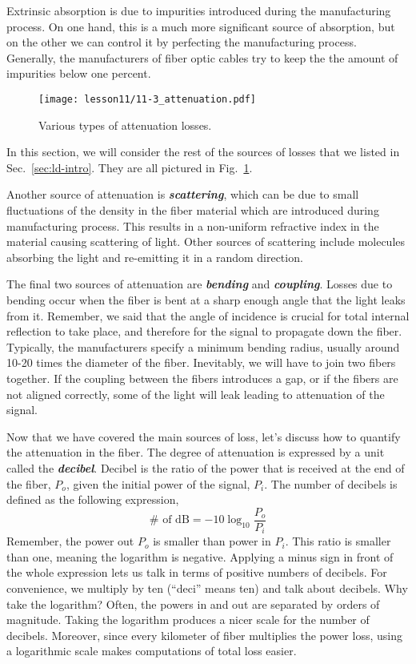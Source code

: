 Extrinsic absorption is due to impurities introduced during the manufacturing process.
On one hand, this is a much more significant source of absorption, but on the other we can control it by perfecting the manufacturing process.
Generally, the manufacturers of fiber optic cables try to keep the the amount of impurities below one percent.

\begin{figure}[t]
    \centering
    \texttt{[image: lesson11/11-3\_attenuation.pdf]}
    \caption[Attenuation losses.]{Various types of attenuation losses.}
    \label{fig:11-3_attenuation}
\end{figure}
In this section, we will consider the rest of the sources of losses that we listed in Sec.~\ref{sec:ld-intro}.
They are all pictured in Fig.~\ref{fig:11-3_attenuation}.

Another source of attenuation is \textbf{\emph{scattering}}, which can be due to small fluctuations of the density in the fiber material which are introduced during manufacturing process.
This results in a non-uniform refractive index in the material causing scattering of light.
Other sources of scattering include molecules absorbing the light and re-emitting it in a random direction.

The final two sources of attenuation are \textbf{\emph{bending}} and \textbf{\emph{coupling}}.
Losses due to bending occur when the fiber is bent at a sharp enough angle that the light leaks from it.
Remember, we said that the angle of incidence is crucial for total internal reflection to take place, and therefore for the signal to propagate down the fiber.
Typically, the manufacturers specify a minimum bending radius, usually around 10-20 times the diameter of the fiber.
Inevitably, we will have to join two fibers together.
If the coupling between the fibers introduces a gap, or if the fibers are not aligned correctly, some of the light will leak leading to attenuation of the signal.

Now that we have covered the main sources of loss, let's discuss how to quantify the attenuation in the fiber.
The degree of attenuation is expressed by a unit called the \textbf{\emph{decibel}}.
Decibel is the ratio of the power that is received at the end of the fiber, $P_o$, given the initial power of the signal, $P_i$.
The number of decibels is defined as the following expression,
\begin{equation}
    \# \text { of } \mathrm{dB}=-10 \log _{10} \frac{P_o}{P_i}
    \label{eq:decibels}
\end{equation}
Remember, the power out $P_o$ is smaller than power in $P_i$.
This ratio is smaller than one, meaning the logarithm is negative.
Applying a minus sign in front of the whole expression lets us talk in terms of positive numbers of decibels.
For convenience, we multiply by ten (``deci'' means ten) and talk about decibels.
Why take the logarithm?
Often, the powers in and out are separated by orders of magnitude.
Taking the logarithm produces a nicer scale for the number of decibels.
Moreover, since every kilometer of fiber multiplies the power loss, using a logarithmic scale makes computations of total loss easier.

